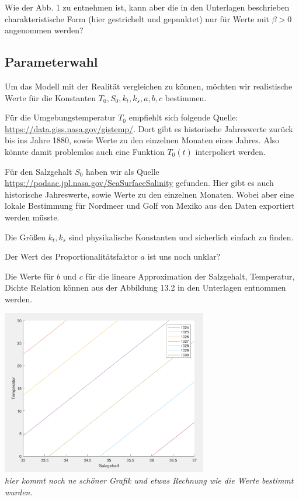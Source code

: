 \documentclass[11pt,a4paper]{article}
\begin{document}
	Wie der Abb. 1 zu entnehmen ist, kann aber die in den Unterlagen beschrieben charakteristische Form (hier gestrichelt und gepunktet) nur für Werte mit \(\beta > 0\) angenommen werden?
	
	\subsection*{Parameterwahl}
	
	Um das Modell mit der Realität vergleichen zu können, möchten wir realistische Werte für die Konstanten \( T_0, S_0, k_t, k_s,  a, b, c\) bestimmen.
	
	Für die Umgebungstemperatur \(T_0\) empfiehlt sich folgende Quelle: \url{https://data.giss.nasa.gov/gistemp/}. Dort gibt es historische Jahreswerte zurück bis ins Jahre 1880, sowie Werte zu den einzelnen Monaten eines Jahres. Also könnte damit problemlos auch eine Funktion \(T_0(t)\) interpoliert werden.
	
	Für den Salzgehalt \(S_0\) haben wir als Quelle \url{https://podaac.jpl.nasa.gov/SeaSurfaceSalinity} gefunden. Hier gibt es auch historische Jahreswerte, sowie Werte zu den einzelnen Monaten. Wobei aber eine lokale Bestimmung für Nordmeer und Golf von Mexiko aus den Daten exportiert werden müsste.
	
	Die Größen \(k_t, k_s\) sind physikalische Konstanten und sicherlich einfach zu finden.
	
	Der Wert des Proportionalitätsfaktor \(a\) ist uns noch unklar?
	
	Die Werte für \(b\) und \(c\) für die lineare Approximation der Salzgehalt, Temperatur, Dichte Relation können aus der Abbildung 13.2 in den Unterlagen entnommen werden.
	
	\begin{center}
	\includegraphics[width=9cm]{Diagramme/salz_temp_dichte.png} \\
	\textit{hier kommt noch ne schöner Grafik und etwas Rechnung wie die Werte bestimmt wurden.}
	\end{center}	
	
\end{document}
